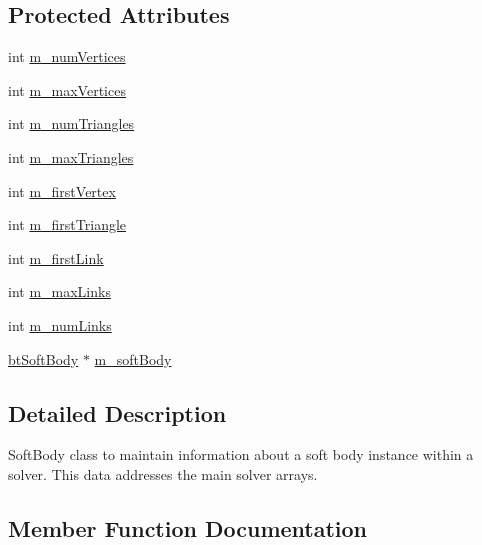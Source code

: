 \subsection*{Protected Attributes}
\begin{DoxyCompactItemize}
\item 
int \hyperlink{classbtDX11SoftBodySolver_1_1btAcceleratedSoftBodyInterface_a72b2382d4a25c7d3124b468963b60671}{m\+\_\+num\+Vertices}
\item 
int \hyperlink{classbtDX11SoftBodySolver_1_1btAcceleratedSoftBodyInterface_a2420af1b2414a1d7acc7f22a0ff78dda}{m\+\_\+max\+Vertices}
\item 
int \hyperlink{classbtDX11SoftBodySolver_1_1btAcceleratedSoftBodyInterface_a9342b3daf5a161a9a330b568ca443a91}{m\+\_\+num\+Triangles}
\item 
int \hyperlink{classbtDX11SoftBodySolver_1_1btAcceleratedSoftBodyInterface_a27999dea8ef1b24191a85f51beb060f3}{m\+\_\+max\+Triangles}
\item 
int \hyperlink{classbtDX11SoftBodySolver_1_1btAcceleratedSoftBodyInterface_addd5d6f7b4ed8ddf7c9382543d6d70ba}{m\+\_\+first\+Vertex}
\item 
int \hyperlink{classbtDX11SoftBodySolver_1_1btAcceleratedSoftBodyInterface_a04ee8fba120b0bf0fd6db98064294938}{m\+\_\+first\+Triangle}
\item 
int \hyperlink{classbtDX11SoftBodySolver_1_1btAcceleratedSoftBodyInterface_a811f39a00ed617732c5a39d946f13179}{m\+\_\+first\+Link}
\item 
int \hyperlink{classbtDX11SoftBodySolver_1_1btAcceleratedSoftBodyInterface_a925199ca22b1b2e8ea23e1fc01d7e82e}{m\+\_\+max\+Links}
\item 
int \hyperlink{classbtDX11SoftBodySolver_1_1btAcceleratedSoftBodyInterface_a6e0c7aeae94c8a6f786c3f5d319b3e67}{m\+\_\+num\+Links}
\item 
\hyperlink{classbtSoftBody}{bt\+Soft\+Body} $\ast$ \hyperlink{classbtDX11SoftBodySolver_1_1btAcceleratedSoftBodyInterface_a9407805dacf1ff1c559f33025c9e08a1}{m\+\_\+soft\+Body}
\end{DoxyCompactItemize}


\subsection{Detailed Description}
Soft\+Body class to maintain information about a soft body instance within a solver. This data addresses the main solver arrays. 

\subsection{Member Function Documentation}
\mbox{\label{classbtDX11SoftBodySolver_1_1btAcceleratedSoftBodyInterface_ace99e4c1e9cbb3a08e5d1d2688fc02e2}} 
